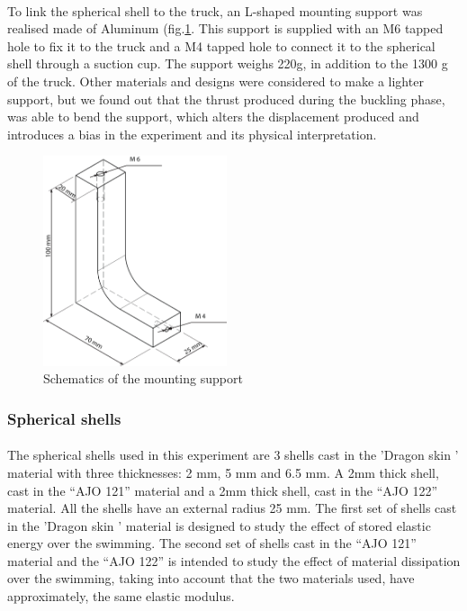\paragraph{}
To link the spherical shell to the truck, an L-shaped mounting support was realised made of Aluminum (fig.\ref{fig:mounting_support}. This support is supplied with an M6 tapped hole to fix it to the truck and a M4 tapped hole to connect it to the spherical shell through a suction cup. The support weighs 220g, in addition to the 1300 g of the truck. Other materials and designs were considered to make a lighter support, but we found out that the thrust produced during the buckling phase, was able to bend the support, which alters the displacement produced and introduces a bias in the experiment and its physical interpretation.
\begin{figure}[H] %
	\centering%
	\includegraphics[width=0.48\textwidth]{figures/Chapter_1/Support.png}
	\caption{Schematics of the mounting support}
	\label{fig:mounting_support}
\end{figure}

\subsubsection{Spherical shells}
\paragraph{}
The spherical shells used in this experiment are 3 shells cast in the 'Dragon skin ' material with three thicknesses: 2 mm, 5 mm and 6.5 mm. A 2mm thick shell, cast in the "`AJO 121"' material and a 2mm thick shell, cast in the "`AJO 122"' material. All the shells have an external radius 25 mm. 
The first set of shells cast in the 'Dragon skin ' material is designed to study the effect of stored elastic energy over the swimming.
The second set of shells cast in the "`AJO 121"' material and the "`AJO 122"' is intended to study the effect of material dissipation over the swimming, taking into account that the two materials used, have approximately, the same elastic modulus.
